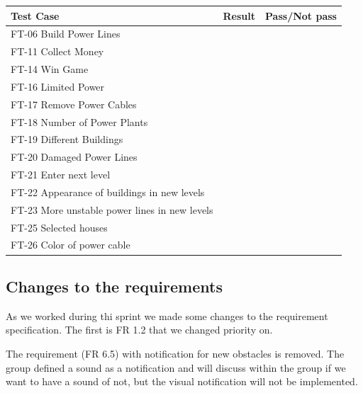 	\begin{tabular}{| p{2cm} | p{7cm} | p{3cm} |}
		\hline
		\rowcolor{lightgray}
		{\bf Test Case} & {\bf Result} & {\bf Pass/Not pass} \\ \hline

	  	FT-06 Build Power Lines &  &  \\ \hline

	  	FT-11 Collect Money &  &  \\ \hline

	  	FT-14 Win Game &  &  \\ \hline
	  	
	  	FT-16 Limited Power &  &  \\ \hline
	  	
	  	FT-17 Remove Power Cables &  &  \\ \hline
	  	
	  	FT-18 Number of Power Plants &  &  \\ \hline
	  	
	  	FT-19 Different Buildings &  &  \\ \hline

	  	FT-20 Damaged Power Lines &  &  \\ \hline
	  	
	  	FT-21 Enter next level &  &  \\ \hline

	  	FT-22 Appearance of buildings in new levels &  &  \\ \hline

	  	FT-23 More unstable power lines in new levels &  &  \\ \hline

	  	FT-25 Selected houses &  &  \\ \hline

	  	FT-26 Color of power cable &  &  \\ \hline

	\end{tabular}

\subsection{Changes to the requirements}

	As we worked during thi sprint we made some changes to the requirement specification.
	The first is FR 1.2 that we changed priority on. 

	The requirement (FR 6.5) with notification for new obstacles is removed. 
	The group defined a sound as a notification and will discuss within the group if
	we want to have a sound of not, but the visual notification will not be implemented. 

